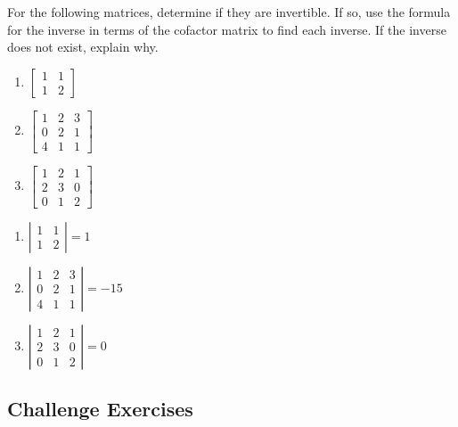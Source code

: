 \documentclass{ximera}
\begin{document}
\begin{problem}\label{prb:7.31} For the following matrices, determine if they are invertible. If so, use the formula for the inverse in terms of the cofactor matrix to
find each inverse. If the inverse does not exist, explain why.
\begin{enumerate}
\item
$\left[
\begin{array}{rr}
1 & 1 \\
1 & 2
\end{array}
\right]$
\item
$\left[
\begin{array}{rrr}
1 & 2 & 3 \\
0 & 2 & 1 \\
4 & 1 & 1
\end{array}
\right]$
\item
$\left[
\begin{array}{rrr}
1 & 2 & 1 \\
2 & 3 & 0 \\
0 & 1 & 2
\end{array}
\right] $
\end{enumerate}
\begin{hint}
\begin{enumerate}
\item $\left\vert
\begin{array}{cc}
1 & 1 \\
1 & 2
\end{array}
\right\vert = 1$
\item $\left\vert
\begin{array}{ccc}
1 & 2 & 3 \\
0 & 2 & 1 \\
4 & 1 & 1%
\end{array}
\right\vert = -15$
\item $\left\vert
\begin{array}{ccc}
1 & 2 & 1 \\
2 & 3 & 0 \\
0 & 1 & 2
\end{array}
\right\vert = 0$
\end{enumerate}
\end{hint}
\end{problem}

\subsection*{Challenge Exercises}
\end{document}
